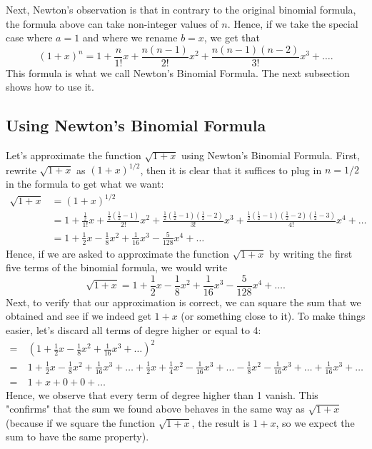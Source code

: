 \documentclass{article}
\theoremstyle{plain}
\theoremstyle{definition}
\begin{document}
Next, Newton's observation is that in contrary to the original binomial formula, the formula above can take non-integer values of $n$. Hence, if we take the special case where $a = 1$ and where we rename $b = x$, we get that
$$(1 + x)^n = 1 + \frac{n}{1!}x + \frac{n(n-1)}{2!}x^2 + \frac{n(n-1)(n-2)}{3!}x^3 + \dots .$$
This formula is what we call Newton's Binomial Formula. The next subsection shows how to use it.

\subsection*{Using Newton's Binomial Formula}

Let's approximate the function $\sqrt{1+x}$ using Newton's Binomial Formula. First, rewrite $\sqrt{1 + x}$ as $(1+x)^{1/2}$, then it is clear that it suffices to plug in $n = 1/2$ in the formula to get what we want:
\begin{align*}
    \sqrt{1 + x} &= (1+x)^{1/2} \\
    &= 1 + \frac{\frac{1}{2}}{1!}x + \frac{\frac{1}{2}(\frac{1}{2}-1)}{2!}x^2 + \frac{\frac{1}{2}(\frac{1}{2}-1)(\frac{1}{2}-2)}{3!}x^3 + \frac{\frac{1}{2}(\frac{1}{2}-1)(\frac{1}{2}-2)(\frac{1}{2}-3)}{4!}x^4 + \dots  \\
    &= 1 + \frac{1}{2}x - \frac{1}{8}x^2 + \frac{1}{16}x^3 - \frac{5}{128}x^4 + \dots
\end{align*}
Hence, if we are asked to approximate the function $\sqrt{1 + x}$ by writing the first five terms of the binomial formula, we would write
$$\sqrt{1 + x} = 1 + \frac{1}{2}x - \frac{1}{8}x^2 + \frac{1}{16}x^3 - \frac{5}{128}x^4 + \dots.$$
Next, to verify that our approximation is correct, we can square the sum that we obtained and see if we indeed get $1 + x$ (or something close to it). To make things easier, let's discard all terms of degre higher or equal to 4:
\begin{align*}
    = & \ \left(1 + \frac{1}{2}x - \frac{1}{8}x^2 + \frac{1}{16}x^3 + \dots\right)^2 \\
    =& \ 1 + \frac{1}{2}x - \frac{1}{8}x^2 + \frac{1}{16}x^3 + \dots + \frac{1}{2}x + \frac{1}{4}x^2 - \frac{1}{16}x^3 + \dots -\frac{1}{8}x^2 - \frac{1}{16}x^3 + \dots + \frac{1}{16}x^3 + \dots \\
    =& \ 1 + x + 0 + 0 + \dots
\end{align*}
Hence, we observe that every term of degree higher than 1 vanish. This "confirms" that the sum we found above behaves in the same way as $\sqrt{1 + x}$ (because if we square the function $\sqrt{1 + x}$, the result is $1 + x$, so we expect the sum to have the same property).
\end{document}

